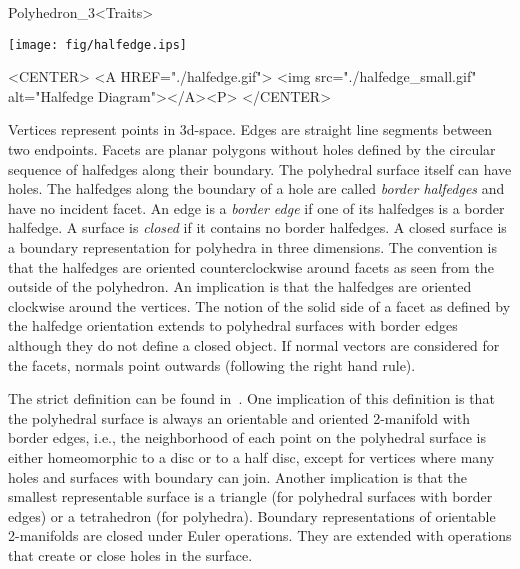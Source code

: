 \begin{ccRefClass}{Polyhedron_3<Traits>}
\begin{ccTexOnly}
    \vspace{-7mm}
    \begin{center}
      \parbox{0.4\textwidth}{%
          \texttt{[image: fig/halfedge.ips]}%
      }
    \end{center}
    \vspace{-5mm}
\end{ccTexOnly}

\begin{ccHtmlOnly}
    <CENTER>
    <A HREF="./halfedge.gif">
        <img src="./halfedge_small.gif" alt="Halfedge Diagram"></A><P>
    </CENTER>
\end{ccHtmlOnly}

Vertices represent points in 3d-space. Edges are straight line segments
between two endpoints. Facets are planar polygons without holes
defined by the circular sequence of halfedges along their boundary.
The polyhedral surface itself can have holes. The halfedges
along the boundary of a hole are called {\em border halfedges\/} and
have no incident facet. An edge is a {\em border edge\/} if one of
its halfedges is a border halfedge.  A surface is {\em closed\/} if it
contains no border halfedges. A closed surface is a boundary
representation for polyhedra in three dimensions. The convention is
that the halfedges are oriented counterclockwise around facets as seen
from the outside of the polyhedron. An implication is that the
halfedges are oriented clockwise around the vertices. The notion of
the solid side of a facet as defined by the halfedge orientation
extends to polyhedral surfaces with border edges although they do not
define a closed object. If normal vectors are considered for the
facets, normals point outwards (following the right hand rule).

The strict definition can be found in~\cite{k-ugpdd-99}. One
implication of this definition is that the polyhedral surface is
always an orientable and oriented 2-manifold with border edges, i.e.,
the neighborhood of each point on the polyhedral surface is either
homeomorphic to a disc or to a half disc, except for vertices where
many holes and surfaces with boundary can join. Another implication is
that the smallest representable surface is a triangle (for polyhedral
surfaces with border edges) or a tetrahedron (for polyhedra). Boundary
representations of orientable 2-manifolds are closed under Euler
operations. They are extended with operations that create or close
holes in the surface.


\end{ccRefClass}
